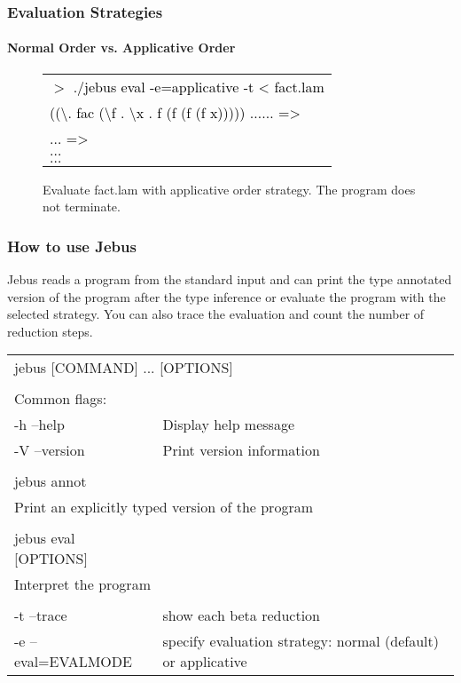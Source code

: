 \documentclass[xcolor=table]{beamer}
\newcommand{\tab}{\hspace*{1.2em}}
\begin{document}
\begin{frame}
\frametitle{Evaluation Strategies}
\framesubtitle{Normal Order vs. Applicative Order}
\begin{block}{
		 \begin{figure}[h!]
				\begin{footnotesize}
				 \begin{tabular}{l}
				 \textcolor{black}{
			      $>$ ./jebus eval -e=applicative -t < fact.lam} \\
			      \textcolor{black}{((\textbackslash . fac (\textbackslash f . \textbackslash x . f (f (f (f x))))) $\ldots \ldots$ =>} \\ 
			      \textcolor{black}{$\ldots$ =>} \\
				  \textcolor{black}{$\ldots$} \\
			      \textcolor{black}{$\ldots$} \\
			      \end{tabular}	
			  \end{footnotesize}			  
			  \caption{Evaluate fact.lam with applicative order strategy. The program does not terminate.}
		 \end{figure}	          
}
\end{block}
\end{frame}

\begin{frame}
\frametitle{How to use Jebus}
\begin{scriptsize}
Jebus reads a program from the standard input and can print the type annotated version of the program after the type inference or evaluate the program with the selected strategy. You can also trace the evaluation and count the number of reduction steps. \\ \medskip
{}
\begin{tabular}{l p{5cm}}
\multicolumn{2}{l}{jebus [COMMAND] ... [OPTIONS]} \\
&\\
Common flags: &\\
 \tab -h --help &            Display help message \\
 \tab -V --version &       Print version information \\
&\\
jebus annot& \\
\multicolumn{2}{l}{\tab  Print an explicitly typed version of the program}\\
&\\
jebus eval [OPTIONS] &\\
\multicolumn{2}{l}{\tab  Interpret the program} \\
&\\
 \tab  -t --trace         & show each beta reduction \\
 \tab -e --eval=EVALMODE & specify evaluation strategy: normal (default) or applicative \\
                                    

\end{tabular}
\end{scriptsize}
\end{frame}
\end{document}
